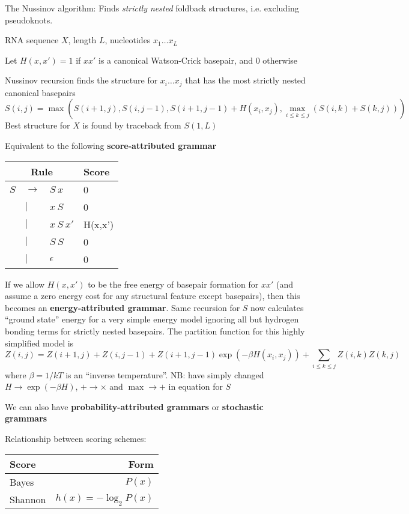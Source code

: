 \documentclass{beamer}
\begin{document}
\begin{frame}{}
\itemb
\item The Nussinov algorithm: Finds {\em strictly nested} foldback structures, i.e. excluding pseudoknots.
 \itemb
 \item RNA sequence $X$, length $L$, nucleotides $x_1 \ldots x_L$
 \item Let $H(x,x')=1$ if $xx'$ is a canonical Watson-Crick basepair, and $0$ otherwise
 \item Nussinov recursion finds the structure for $x_i \ldots x_j$ that has the most strictly nested canonical basepairs
\[
S(i,j) = \max \left( S(i+1,j), S(i,j-1), S(i+1,j-1) + H(x_i,x_j), \max_{i \leq k \leq j} (S(i,k) + S(k,j)) \right)
\]
Best structure for $X$ is found by traceback from $S(1,L)$
 \item Equivalent to the following {\bf score-attributed grammar}
\begin{tabular}{rll|l}
\multicolumn{3}{c|}{Rule} & Score \\
\hline
$S$ & $\to$ & $S\ x$     & 0 \\
    &   $|$ & $x\ S$     & 0 \\
    &   $|$ & $x\ S\ x'$ & H(x,x') \\
    &   $|$ & $S\ S$     & 0 \\
    &   $|$ & $\epsilon$ & 0
\end{tabular}
 \item If we allow $H(x,x')$ to be the free energy of basepair formation for $xx'$
(and assume a zero energy cost for any structural feature except basepairs),
then this becomes an {\bf energy-attributed grammar}.
Same recursion for $S$ now calculates ``ground state'' energy
for a very simple energy model ignoring all but hydrogen bonding terms for strictly nested basepairs.
The partition function for this highly simplified model is
\[
Z(i,j) = Z(i+1,j) + Z(i,j-1) + Z(i+1,j-1) \exp (-\beta H(x_i,x_j)) + \sum_{i \leq k \leq j} Z(i,k) Z(k,j)
\]
where $\beta = 1/kT$ is an ``inverse temperature''.
NB: have simply changed $H \to \exp(-\beta H)$, $+ \to \times$ and $\max \to +$ in equation for $S$
 \item We can also have {\bf probability-attributed grammars} or {\bf stochastic grammars}
 \item Relationship between scoring schemes:
\begin{tabular}{l|r}
Score & Form \\
\hline
Bayes     & $P(x)$ \\
Shannon   & $h(x) = -\log_2 P(x)$ \\

\end{tabular}
\end{frame}
\end{document}
